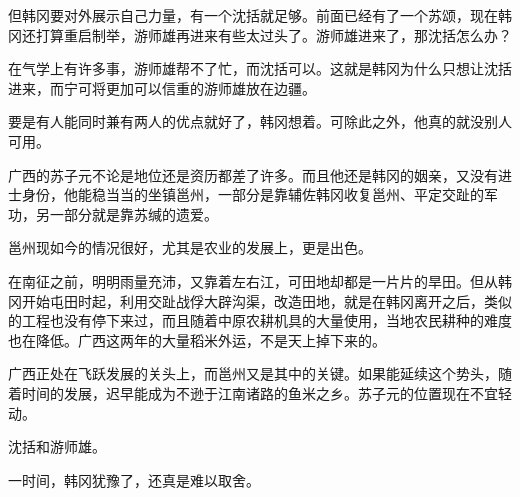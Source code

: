 但韩冈要对外展示自己力量，有一个沈括就足够。前面已经有了一个苏颂，现在韩冈还打算重启制举，游师雄再进来有些太过头了。游师雄进来了，那沈括怎么办？

在气学上有许多事，游师雄帮不了忙，而沈括可以。这就是韩冈为什么只想让沈括进来，而宁可将更加可以信重的游师雄放在边疆。

要是有人能同时兼有两人的优点就好了，韩冈想着。可除此之外，他真的就没别人可用。

广西的苏子元不论是地位还是资历都差了许多。而且他还是韩冈的姻亲，又没有进士身份，他能稳当当的坐镇邕州，一部分是靠辅佐韩冈收复邕州、平定交趾的军功，另一部分就是靠苏缄的遗爱。

邕州现如今的情况很好，尤其是农业的发展上，更是出色。

在南征之前，明明雨量充沛，又靠着左右江，可田地却都是一片片的旱田。但从韩冈开始屯田时起，利用交趾战俘大辟沟渠，改造田地，就是在韩冈离开之后，类似的工程也没有停下来过，而且随着中原农耕机具的大量使用，当地农民耕种的难度也在降低。广西这两年的大量稻米外运，不是天上掉下来的。

广西正处在飞跃发展的关头上，而邕州又是其中的关键。如果能延续这个势头，随着时间的发展，迟早能成为不逊于江南诸路的鱼米之乡。苏子元的位置现在不宜轻动。

沈括和游师雄。

一时间，韩冈犹豫了，还真是难以取舍。

